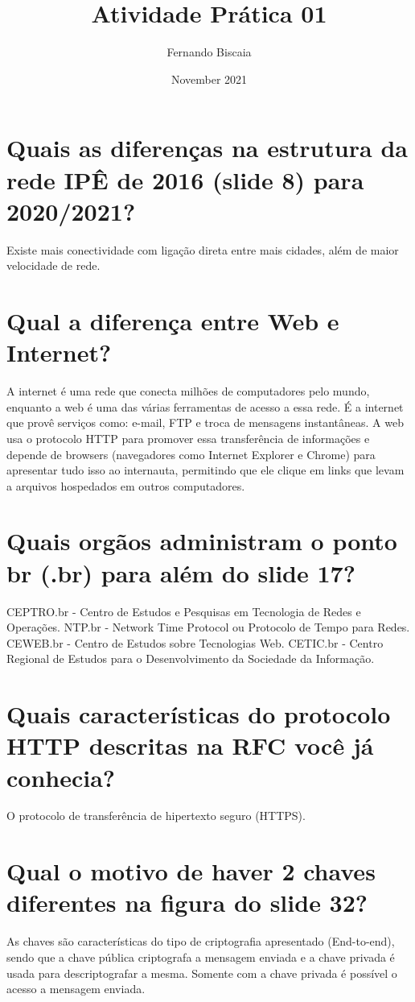\documentclass{article}
\title{Atividade Prática 01}
\author{Fernando Biscaia }
\date{November 2021}
\begin{document}
\maketitle

\section{Quais as diferenças na estrutura da rede IPÊ de 2016 (slide 8) para 2020/2021?}

Existe mais conectividade com ligação direta entre mais cidades, além de maior velocidade de rede.

\section{Qual a diferença entre Web e Internet?}

A internet é uma rede que conecta milhões de computadores pelo mundo, enquanto a web é uma das várias ferramentas de acesso a essa rede. É a internet que provê serviços como: e-mail, FTP e troca de mensagens instantâneas. A web usa o protocolo HTTP para promover essa transferência de informações e depende de browsers (navegadores como Internet Explorer e Chrome) para apresentar tudo isso ao internauta, permitindo que ele clique em links que levam a arquivos hospedados em outros computadores.

\section{Quais orgãos administram o ponto br (.br) para além do slide 17?}

CEPTRO.br - Centro de Estudos e Pesquisas em Tecnologia de Redes e Operações. NTP.br - Network Time Protocol ou Protocolo de Tempo para Redes. CEWEB.br - Centro de Estudos sobre Tecnologias Web. CETIC.br - Centro Regional de Estudos para o Desenvolvimento da Sociedade da Informação.

\section{Quais características do protocolo HTTP descritas na RFC você já conhecia?}

O protocolo de transferência de hipertexto seguro (HTTPS).

\section{Qual o motivo de haver 2 chaves diferentes na figura do slide 32?}

As chaves são características do tipo de criptografia apresentado (End-to-end), sendo que a chave pública criptografa a mensagem enviada e a chave privada é usada para descriptografar a mesma. Somente com a chave privada é possível o acesso a mensagem enviada.
\end{document}
